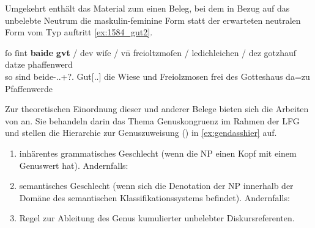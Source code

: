 Umgekehrt enthält das Material zum \CAO{} einen Beleg, bei dem in
Bezug auf das un\-belebte Neutrum   die maskulin-feminine
Form  statt der erwarteten neutralen Form vom Typ 
auftritt \cref{ex:1584_gut2}.

\begin{exe}
\ex\label{ex:1584_gut2}
	\gll ſo ſint \textbf{baide} \textbf{gvt} / dev wiſe / vn̄ freioltzmoſen /
			ledichleichen / dez gotzhauſ datze phaffenwerd \\
		so sind beide-\Nom.\Pl.\M+\F?\subI.\St{} Gut[\Nom.\Pl.\NeutI] {} die
			Wiese {} und Freiolzmosen {} frei {} des Gotteshaus da=zu
			Pfaffenwerde \\
	\begin{taggedline}{\parencites(Kl.~Herrenchiemsee, Kr.~Rosenheim, 1292)[\pno~1584, 727.26--27]{cao2}}
		\trans {}
	\end{taggedline}
\end{exe}


Zur theoretischen Einordnung dieser und anderer Belege bieten sich die Arbeiten
von \textcites[171--195]{wechslerzlatic2003}{wechsler2009} an. Sie behandeln
darin das Thema Genus\-kongruenz im Rahmen der LFG \autocites(vgl.~%
\cref{sec:lfgkongr}){bresnanetal2016} und stellen die Hierarchie zur
Genuszuweisung () in \cref{ex:gendasshier} auf.

\begin{exe}
\ex\label{ex:gendasshier}
	\begin{taggedline}{\parencites[nach][584]{wechsler2009}[vgl.][195]{wechslerzlatic2003}}
		\begin{enumerate}[noitemsep]
			\item inhärentes grammatisches Geschlecht (wenn die NP einen Kopf
				mit einem Genuswert hat). Andernfalls:
			\item semantisches Geschlecht (wenn sich die Denotation der NP
				innerhalb der Domäne des semantischen Klassifikationssystems
				befindet). Andernfalls:
			\item Regel zur Ableitung des Genus kumulierter unbelebter 
				Diskursreferenten.
		\end{enumerate}
	\end{taggedline}
\end{exe}

